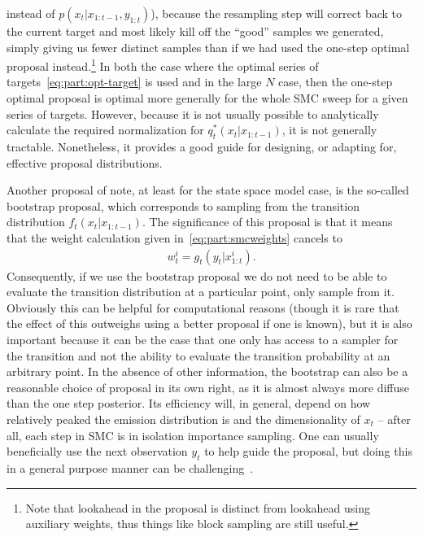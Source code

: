instead of $p(x_{t} |x_{1:t-1},y_{1:t})$), because the resampling step will correct back to the current target and
most likely kill off the ``good'' samples we generated, simply giving us fewer distinct samples than if we had
used the one-step optimal proposal instead.\footnote{Note that lookahead in the proposal is distinct from
	lookahead using auxiliary weights, thus things like block sampling are still useful.}
In both the case where the optimal series of targets~\eqref{eq:part:opt-target} is used and in the large $N$ case, then
the one-step optimal proposal is optimal more generally for the whole SMC sweep for a given series of targets.  However, because it is
not usually possible to analytically calculate the required normalization for $q_t^*(x_t | x_{1:t-1})$, it is
not generally tractable.  Nonetheless, it provides a good guide for designing, or adapting for, effective proposal
distributions.

Another proposal of note, at least for the state space model case, is the so-called bootstrap proposal, which
corresponds to sampling from the transition distribution $f_t(x_t | x_{1:t-1})$.  The significance of this proposal
is that it means that the weight calculation given in~\eqref{eq:part:smcweights} cancels to
\begin{align}
\label{eq:part:bootstrap-weights}
w_t^i = g_t (y_t | x_{1:t}^i).
\end{align}
Consequently, if we use the bootstrap proposal we do not need to be able to evaluate the transition distribution
at a particular point, only sample from it.  Obviously this can be helpful for computational reasons (though
it is rare that the effect of this outweighs using a better proposal if one is known), but it is also important
because it can be the case that one only has access to a sampler for the transition and not the ability to evaluate
the transition probability at an arbitrary point.
In the absence of other information, the bootstrap can also be a reasonable choice of proposal in its own right, as
it is almost always more diffuse than the one step posterior.  Its efficiency will, in general, depend on how relatively
peaked the emission distribution is and the dimensionality of $x_t$ -- after all, each step in SMC is in
isolation importance sampling.  One can usually beneficially use the next observation $y_t$ to help guide
the proposal, but doing this in a general purpose manner can be challenging~\citep{gu2015neural}.
